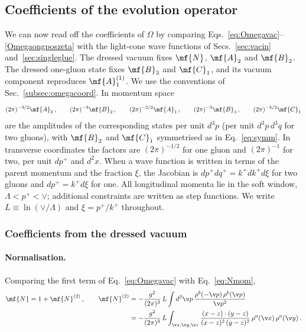 \subsection{Coefficients of the evolution operator}\label{subsec:coefficients}
We can now read off the coefficients of $\Omega$ by comparing Eqs.~\eqref{eq:Omegavac}--\eqref{Omegaongposzeta}
with the light-cone wave functions of Secs.~\ref{sec:vacin} and~\ref{sec:singleglue}. The dressed vacuum
fixes $\mf{N}$, $\mf{A}_{2}$ and $\mf{B}_{2}$. The dressed one-gluon state fixes $\mf{B}_{3}$ and $\mf{C}_{1}$,
and its vacuum component reproduces $\mf{A}^{(1)}_{1}$. We use the conventions of
Sec.~\ref{subsec:omegacoord}. In momentum space
\begin{align}\label{eq:matchrules}
(2\pi)^{-3/2}\mf{A}_{2}\,,\qquad (2\pi)^{-3}\mf{B}_{2}\,,\qquad (2\pi)^{-3/2}\mf{A}_{1}\,,\qquad
(2\pi)^{-3}\mf{B}_{3}\,,\qquad (2\pi)^{-3/2}\mf{C}_{1}
\end{align}
are the amplitudes of the corresponding states per unit $d^{3}p$ (per unit $d^{3}p\,d^{3}q$ for two
gluons), with $\mf{B}_{2}$ and $\mf{C}_{1}$ symmetrised as in Eq.~\eqref{eq:symm}. In transverse
coordinates the factors are $(2\pi)^{-1/2}$ for one gluon and $(2\pi)^{-1}$ for two, per unit $dp^{+}$ and
$d^{2}x$. When a wave function is written in terms of the parent momentum and the fraction $\xi$, the
Jacobian is $dp^{+}dq^{+}=k^{+}dk^{+}d\xi$ for two gluons and $dp^{+}=k^{+}d\xi$ for one. All longitudinal
momenta lie in the soft window, $\Lambda<p^{+}<\vee$; additional constraints are written as step
functions. We write $L\equiv\ln(\vee/\Lambda)$ and $\xi=p^{+}/k^{+}$ throughout.

\subsubsection{Coefficients from the dressed vacuum}\label{subsec:coeffvac}

\paragraph{Normalisation.}
Comparing the first term of Eq.~\eqref{eq:Omegavac} with Eq.~\eqref{eq:Nmom},
\begin{align}\label{Ncoeffmom}
\mf{N}=1+\mf{N}^{(2)}\,,\qquad
\mf{N}^{(2)}&=-\frac{g^{2}}{(2\pi)^{3}}\,L\int d^{2}\v p\,\frac{\rho^{b}(-\v p)\,\rho^{b}(\v p)}{\v p^{2}}\notag\\
&=-\frac{g^{2}}{(2\pi)^{3}}\,L\int_{\v x,\v y,\v z}\frac{(x-z)\cdot(y-z)}{(x-z)^{2}\,(y-z)^{2}}\,
\rho^{a}(\v x)\,\rho^{a}(\v y)\,.
\end{align}

